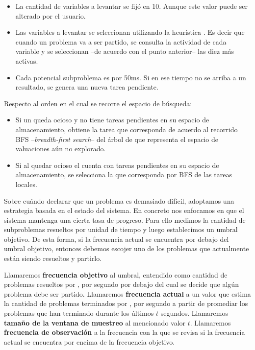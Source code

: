 \begin{itemize}
	\item La cantidad de variables a levantar se fijó en 10. Aunque este valor puede ser alterado por el usuario.
	\item Las variables a levantar se seleccionan utilizando la heurística \vsids. Es decir que cuando un problema va a ser partido, se consulta la actividad de cada variable y se seleccionan --de acuerdo con el punto anterior-- las diez más activas.
	\item Cada potencial subproblema es \solveado por 50ms. Si en ese tiempo no se arriba a un resultado, se genera una nueva tarea pendiente.
\end{itemize}

Respecto al orden en el cual se recorre el espacio de búsqueda:

\begin{itemize}
	\item Si un \w queda ocioso y no tiene tareas pendientes en su espacio de almacenamiento, obtiene la tarea que corresponda de acuerdo al recorrido BFS --\emph{breadth-first search}-- del árbol de que representa el espacio de valuaciones aún no explorado.
	\item Si al quedar ocioso el \w cuenta con tareas pendientes en su espacio de almacenamiento, se selecciona la que corresponda por BFS de las tareas locales.
\end{itemize}

Sobre cuándo declarar que un problema es demasiado difícil, adoptamos una
estrategia basada en el estado del sistema. En concreto nos enfocamos en que
el sistema mantenga una cierta tasa de progreso. Para ello medimos la cantidad
de subproblemas resueltos por unidad de tiempo y luego establecimos un umbral
objetivo. De esta forma, si la frecuencia actual se encuentra por debajo del umbral
objetivo, entonces debemos escojer uno de los problemas que actualmente están
siendo resueltos y partirlo.

Llamaremos \textbf{frecuencia objetivo} al umbral, entendido como 
cantidad de problemas resueltos por \w, por segundo por debajo del cual se decide que algún
problema debe ser partido. Llamaremos \textbf{frecuencia actual} a un valor
que estima la cantidad de problemas terminados por \w, por segundo a partir de
promediar los problemas que han terminado durante los últimos $t$ segundos.
Llamaremos \textbf{tamaño de la ventana de muestreo} al mencionado valor $t$.
Llamaremos \textbf{frecuencia de observación} a la frecuencia con la que se revisa
si la frecuencia actual se encuentra por encima de la frecuencia objetivo.

